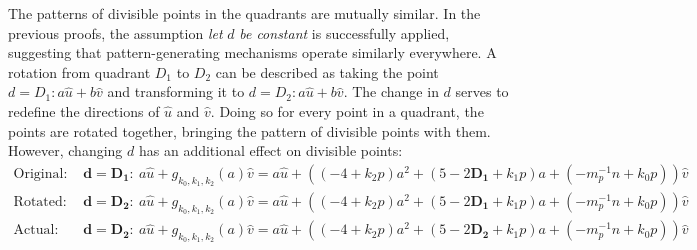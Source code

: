 \documentclass{article}
\begin{document}
The patterns of divisible points in the quadrants are mutually similar. In the previous proofs, the assumption \textit{let }\(d\)\textit{ be constant} is successfully applied, suggesting that pattern-generating mechanisms operate similarly everywhere. A rotation from quadrant \(D_1\) to \(D_2\) can be described as taking the point \(d=D_1:a\hat{u}+b\hat{v}\) and transforming it to \(d=D_2:a\hat{u}+b\hat{v}\). The change in \(d\) serves to redefine the directions of \(\hat{u}\) and \(\hat{v}\). Doing so for every point in a quadrant, the points are rotated together, bringing the pattern of divisible points with them. However, changing \(d\) has an additional effect on divisible points:
\begin{align}
	\nonumber \text{Original: }&\mathbf{d=D_1:}\ a\hat{u}+g_{k_0,k_1,k_2}(a)\hat{v} = a\hat{u}+((-4 + k_2p)a^2 + (5 - 2\mathbf{D_1} + k_1p)a + (-m^{-1}_pn + k_0p))\hat{v} \\
	\nonumber \text{Rotated: }&\mathbf{d=D_2:}\ a\hat{u}+g_{k_0,k_1,k_2}(a)\hat{v} = a\hat{u}+((-4 + k_2p)a^2 + (5 - 2\mathbf{D_1} + k_1p)a + (-m^{-1}_pn + k_0p))\hat{v} \\
	\nonumber \text{Actual: }&\mathbf{d=D_2:}\ a\hat{u}+g_{k_0,k_1,k_2}(a)\hat{v} = a\hat{u}+((-4 + k_2p)a^2 + (5 - 2\mathbf{D_2} + k_1p)a + (-m^{-1}_pn + k_0p))\hat{v}
\end{align}
	
\end{document}

